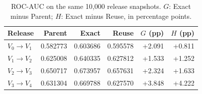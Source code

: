\begin{table}[tb]
 \caption{ROC-AUC on the same 10,000 release snapshots. $G$: Exact minus Parent; $H$: Exact minus Reuse, in percentage points.}
 \label{tab:motivation-auc}
 \centering\small
 \setlength{\tabcolsep}{2pt}
 \begin{tabular*}{\columnwidth}{@{\extracolsep{\fill}}lrrrrr@{}}
 \toprule
 Release & Parent & Exact & Reuse & $G$ (pp) & $H$ (pp)\\\midrule
 $V_0\!\to\!V_1$ & 0.582773 & 0.603686 & 0.595578 & +2.091 & +0.811\\
 $V_1\!\to\!V_2$ & 0.625008 & 0.640335 & 0.627812 & +1.533 & +1.252\\
 $V_2\!\to\!V_3$ & 0.650717 & 0.673957 & 0.657631 & +2.324 & +1.633\\
 $V_3\!\to\!V_4$ & 0.631304 & 0.669788 & 0.627570 & +3.848 & +4.222\\
 \bottomrule
 \end{tabular*}
\end{table}
